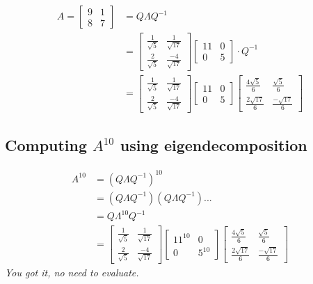 \documentclass[addpoints]{exam}
\begin{document}
\begin{align*}
	A = \begin{bmatrix} 9 & 1 \\ 8 & 7 \end{bmatrix} &= Q \Lambda Q^{-1}\\
	&= \begin{bmatrix} \frac{1}{\sqrt{5}} & \frac{1}{\sqrt{17}} \\ \frac{2}{\sqrt{5}} & \frac{-4}{\sqrt{17}} \end{bmatrix}
	\begin{bmatrix} 11 & 0 \\ 0 & 5 \end{bmatrix} \cdot Q^{-1}\\
	&= \begin{bmatrix} \frac{1}{\sqrt{5}} & \frac{1}{\sqrt{17}} \\ \frac{2}{\sqrt{5}} & \frac{-4}{\sqrt{17}} \end{bmatrix}
	\begin{bmatrix} 11 & 0 \\ 0 & 5 \end{bmatrix}
	\begin{bmatrix} \frac{4\sqrt{5}}{6} & \frac{\sqrt{5}}{6} \\ \frac{2\sqrt{17}}{6} & \frac{-\sqrt{17}}{6} \end{bmatrix}
\end{align*}
\subsection{Computing $A^{10}$ using eigendecomposition}
\begin{align*}
	A^{10} &= \left( Q \Lambda Q^{-1} \right)^{10} \\
	&= \left( Q \Lambda Q^{-1} \right) \left( Q \Lambda Q^{-1} \right) ... \\
	&= Q \Lambda^{10} Q^{-1} \\
	&= \begin{bmatrix} \frac{1}{\sqrt{5}} & \frac{1}{\sqrt{17}} \\ \frac{2}{\sqrt{5}} & \frac{-4}{\sqrt{17}} \end{bmatrix}
	\begin{bmatrix} 11^{10} & 0 \\ 0 & 5^{10} \end{bmatrix}
	\begin{bmatrix} \frac{4\sqrt{5}}{6} & \frac{\sqrt{5}}{6} \\ \frac{2\sqrt{17}}{6} & \frac{-\sqrt{17}}{6} \end{bmatrix}
\end{align*}
\textit{You got it, no need to evaluate.}
\end{document}

